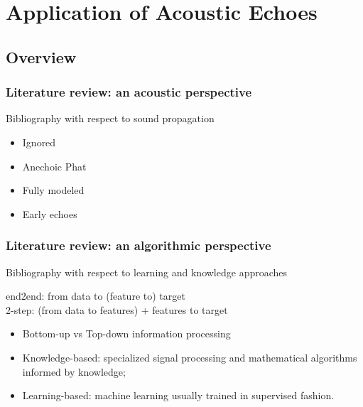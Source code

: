 \chapter{Application of Acoustic Echoes}\label{chap:application}

 \blindtext

\section{Overview}


\subsection{Literature review: an acoustic perspective}
Bibliography with respect to sound propagation
\begin{itemize}
    \item Ignored
    \item Anechoic Phat
    \item Fully modeled
    \item Early echoes
\end{itemize}

\subsection{Literature review: an algorithmic perspective}\cite{subsec:application:algos}
Bibliography with respect to learning and knowledge approaches




end2end: from data to (feature to) target
\\2-step: (from data to features) + features to target

\begin{itemize}
    \item Bottom-up vs Top-down information processing
    \item Knowledge-based: specialized signal processing and mathematical algorithms informed by knowledge;
    \item Learning-based: machine learning usually trained in supervised fashion.
\end{itemize}

